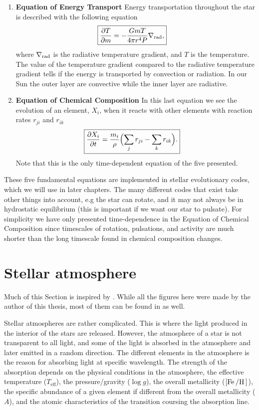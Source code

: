 \begin{enumerate}
    \item \textbf{Equation of Energy Transport}
        \nicebreak
        Energy transportation throughout the star is described with the
        following equation
        \begin{align}
            \Aboxed{\pd{T}{m} &= -\frac{GmT}{4\pi r^4P}\nabla_\tm{rad},}
        \end{align}
        where $\nabla_{\textnormal{rad}}$ is the radiative temperature gradient, and $T$
        is the temperature. The value of the temperature gradient compared to
        the radiative temperature gradient tells if the energy is transported by
        convection or radiation. In our Sun the outer layer are convective while
        the inner layer are radiative.

    \item \textbf{Equation of Chemical Composition}
        \nicebreak
        In this last equation we see the evolution of an element, $X_i$, when
        it reacts with other elements with reaction rates $r_{ji}$ and $r_{ik}$
        \begin{align}
            \Aboxed{\pd{X_i}{t} &= \frac{m_i}{\rho} \Bigl( \sum_j r_{ji} - \sum_k r_{ik}\Bigr).}
        \end{align}
        Note that this is the only time-dependent equation of the five
        presented.
\end{enumerate}

These five fundamental equations are implemented in stellar evolutionary codes,
which we will use in later chapters. The many different codes that exist take
other things into account, e.g the star can rotate, and it may not always be in
hydrostatic equilibrium (this is important if we want our star to pulsate). For
simplicity we have only presented time-dependence in the Equation of Chemical
Composition since timescales of rotation, pulsations, and activity are much
shorter than the long timescale found in chemical composition changes.


\section{Stellar atmosphere}

Much of this Section is inspired by \citet{Gray2006}. While all the figures here
were made by the author of this thesis, most of them can be found in
\citet{Gray2006} as well.

Stellar atmospheres are rather complicated. This is where the light produced in
the interior of the stars are released. However, the atmosphere of a star is not
transparent to all light, and some of the light is absorbed in the atmosphere
and later emitted in a random direction. The different elements in the
atmosphere is the reason for absorbing light at specific wavelength. The
strength of the absorption depends on the physical conditions in the atmosphere,
the effective temperature ($T_\mathrm{eff}$), the pressure/gravity ($\log g$),
the overall metallicity ($[\ion{Fe}/\ion{H}]$), the specific abundance of a
given element if different from the overall metallicity ($A$), and the atomic
characteristics of the transition coursing the absorption line.

